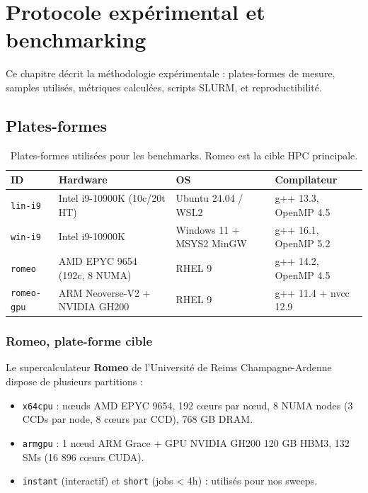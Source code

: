 \chapter{Protocole expérimental et benchmarking}
\label{chap:protocole}

Ce chapitre décrit la méthodologie expérimentale : plates-formes de mesure, samples utilisés, métriques calculées, scripts SLURM, et reproductibilité.

\section{Plates-formes}
\label{sec:proto:plateformes}

\begin{table}[H]
\centering
\begin{tabularx}{\textwidth}{lXll}
\toprule
\textbf{ID} & \textbf{Hardware} & \textbf{OS} & \textbf{Compilateur} \\
\midrule
\texttt{lin-i9} & Intel i9-10900K (10c/20t HT) & Ubuntu 24.04 / WSL2 & g++ 13.3, OpenMP 4.5 \\
\texttt{win-i9} & Intel i9-10900K & Windows 11 + MSYS2 MinGW & g++ 16.1, OpenMP 5.2 \\
\texttt{romeo} & AMD EPYC 9654 (192c, 8 NUMA) & RHEL 9 & g++ 14.2, OpenMP 4.5 \\
\texttt{romeo-gpu} & ARM Neoverse-V2 + NVIDIA GH200 & RHEL 9 & g++ 11.4 + nvcc 12.9 \\
\bottomrule
\end{tabularx}
\caption{Plates-formes utilisées pour les benchmarks. Romeo est la cible HPC principale.}
\label{tab:proto:plateformes}
\end{table}

\subsection{Romeo, plate-forme cible}

Le supercalculateur \textbf{Romeo} de l'Université de Reims Champagne-Ardenne dispose de plusieurs partitions :
\begin{itemize}
    \item \texttt{x64cpu} : nœuds AMD EPYC 9654, 192 cœurs par nœud, 8 NUMA nodes (3 CCDs par node, 8 cœurs par CCD), 768 GB DRAM.
    \item \texttt{armgpu} : 1 nœud ARM Grace + GPU NVIDIA GH200 120 GB HBM3, 132 SMs (16 896 cœurs CUDA).
    \item \texttt{instant} (interactif) et \texttt{short} (jobs < 4h) : utilisés pour nos sweeps.
\end{itemize}

